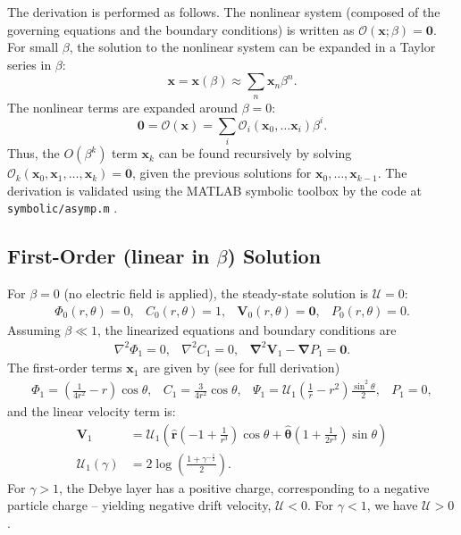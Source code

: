 \documentclass[preprint,10pt]{elsarticle}
\newcommand{\pars}[1]{\left(#1\right)}
\newcommand\Laplacian{\nabla^2}
\newcommand\bnabla{\boldsymbol{\nabla}}
\newcommand\bLaplacian{\boldsymbol{\nabla}^2}
\newcommand\bV{\boldsymbol{V}}
\newcommand\bx{\boldsymbol{x}}
\newcommand\br{\boldsymbol{r}}
\newcommand\brhat{\hat{\br}}
\newcommand\btheta{\boldsymbol{\theta}}
\newcommand\bthetahat{\hat{\btheta}}
\newcommand\bzero{\boldsymbol{0}}
\newcommand\cO{\mathcal{O}}
\newcommand\cU{\mathscr{U}}
\begin{document}
The derivation is performed as follows.
The nonlinear system (composed of the governing equations and the boundary conditions) 
is written as $\cO(\bx;\beta) = \bzero$.
For small $\beta$, the solution to the nonlinear system can be expanded in a Taylor series in $\beta$:
\begin{equation}
\bx = \bx(\beta) \approx \sum_n \bx_n \beta^n.
\end{equation}
The nonlinear terms
are expanded around $\beta = 0$:
\begin{equation}
\bzero = \cO(\bx) = \sum_i \cO_i(\bx_0, \ldots \bx_i) \beta^i.
\end{equation}
Thus, the $O(\beta^k)$ term $\bx_k$ can be found recursively by solving 
$\cO_k(\bx_0, \bx_1, \ldots, \bx_k) = \bzero$,
given the previous solutions for $\bx_0, \ldots, \bx_{k-1}$.
The derivation is validated using the MATLAB symbolic toolbox by the code 
at \verb|symbolic/asymp.m| \cite{source}.

\subsection{First-Order (linear in $\beta$) Solution} \label{app:linear}

For $\beta = 0$ (no electric field is applied), the steady-state solution is $\cU = 0$:
\begin{equation}\begin{array}{cccc}
\varPhi_0(r,\theta) = 0, &
C_0(r,\theta) = 1, &
\bV_0(r,\theta) = \bzero, &
P_0(r,\theta) = 0.
\end{array}\end{equation}
Assuming $\beta \ll 1$, the linearized equations and boundary conditions are
\begin{equation} \begin{array}{ccc}
\Laplacian \varPhi_1 = 0, &
\Laplacian C_1 = 0, &
\bLaplacian \bV_1 - \bnabla P_1 = \bzero.
\end{array}\end{equation}
The first-order terms $\bx_1$ are given by (see \cite{yariv2010migration} for full derivation)
\begin{equation} \begin{array}{cccc}
\varPhi_1 = \pars{\frac{1}{4r^2} - r}\cos\theta, &
C_1 = \frac{3}{4r^2} \cos\theta, &
\Psi_1 = \cU_1 \pars{\frac{1}{r} - r^2} \frac{\sin^2\theta}{2}, &
P_1 = 0,
\end{array} \end{equation}
and the linear velocity term is:
\begin{align} \label{eq:linear_velocity}
\bV_1 &= \cU_1 \pars{ \brhat \pars{-1 + \frac{1}{r^3}}\cos\theta 
+ \bthetahat \pars{1 + \frac{1}{2r^3}} \sin\theta } \\
\cU_1(\gamma) &= 2 \log \pars{\frac{1 + \gamma^{-\frac{1}{2}}}{2}}.
\end{align}
For $\gamma > 1$, the Debye layer has a positive charge, 
corresponding to a negative particle charge -- 
yielding negative drift velocity, $\cU < 0$. 
For $\gamma < 1$, we have $\cU > 0$.
\end{document}
